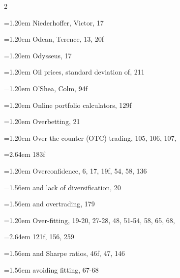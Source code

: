 {\begin{multicols}{2}
\par \noindent\hangindent=1.20em\hspace*{0.00em} Niederhoffer, Victor, 17
\par \noindent\hangindent=1.20em\hspace*{0.00em} Odean, Terence, 13, 20f
\par \noindent\hangindent=1.20em\hspace*{0.00em} Odysseus, 17
\par \noindent\hangindent=1.20em\hspace*{0.00em} Oil prices, standard deviation of, 211
\par \noindent\hangindent=1.20em\hspace*{0.00em} O’Shea, Colm, 94f
\par \noindent\hangindent=1.20em\hspace*{0.00em} Online portfolio calculators, 129f
\par \noindent\hangindent=1.20em\hspace*{0.00em} Overbetting, 21
\par \noindent\hangindent=1.20em\hspace*{0.00em} Over the counter (OTC) trading, 105, 106, 107,
\par \noindent\hangindent=2.64em\hspace*{1.44em} 183f
\par \noindent\hangindent=1.20em\hspace*{0.00em} Overconfidence, 6, 17, 19f, 54, 58, 136
\par \noindent\hangindent=1.56em\hspace*{0.36em} and lack of diversification, 20
\par \noindent\hangindent=1.56em\hspace*{0.36em} and overtrading, 179
\par \noindent\hangindent=1.20em\hspace*{0.00em} Over-fitting, 19-20, 27-28, 48, 51-54, 58, 65, 68,
\par \noindent\hangindent=2.64em\hspace*{1.44em} 121f, 156, 259
\par \noindent\hangindent=1.56em\hspace*{0.36em} and Sharpe ratios, 46f, 47, 146
\par \noindent\hangindent=1.56em\hspace*{0.36em} avoiding fitting, 67-68

\end{multicols}}
